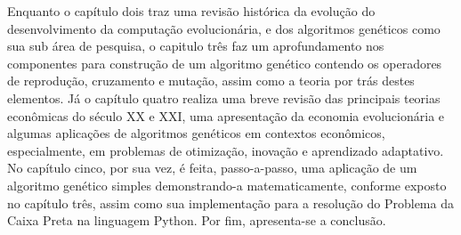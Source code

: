 Enquanto o capítulo dois traz uma revisão histórica da evolução do desenvolvimento da computação evolucionária, e dos algoritmos genéticos como sua sub área de pesquisa, o capitulo três faz um aprofundamento nos componentes para construção de um algoritmo genético contendo os operadores de reprodução, cruzamento e mutação, assim como a teoria por trás destes elementos. Já o capítulo quatro realiza uma breve revisão das principais teorias econômicas do século XX e XXI, uma apresentação da economia evolucionária e algumas aplicações de algoritmos genéticos em contextos econômicos, especialmente, em problemas de otimização, inovação e aprendizado adaptativo. No capítulo cinco, por sua vez, é feita, passo-a-passo, uma aplicação de um algoritmo genético simples demonstrando-a matematicamente, conforme exposto no capítulo três, assim como sua implementação para a resolução do Problema da Caixa Preta na linguagem Python. Por fim, apresenta-se a conclusão.
